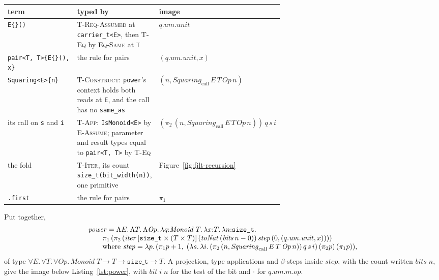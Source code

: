 \begin{center}
\small
\begin{tabularx}{\linewidth}{@{}>{\raggedright\arraybackslash}p{0.36\linewidth}>{\raggedright\arraybackslash}X>{\raggedright\arraybackslash}p{0.27\linewidth}@{}}
\toprule
term & typed by & image \\
\midrule
\texttt{E\{\}()} & \textsc{T-Req-Assumed} at \texttt{carrier\_t<E>}, then \textsc{T-Eq} by \textsc{Eq-Same} at \texttt{T} & $q.\mathit{um}.\mathit{unit}$ \\
\texttt{pair<T, T>\{E\{\}(), x\}} & the rule for pairs & $(q.\mathit{um}.\mathit{unit}, x)$ \\
\texttt{Squaring<E>\{n\}} & \textsc{T-Construct}: \texttt{power}'s context holds both reads at \texttt{E}, and the call has no \texttt{same\_as} & $(n, \mathit{Squaring}_{\mathrm{call}}\,E\,T\,\mathit{Op}\,n)$ \\
its call on \texttt{s} and \texttt{i} & \textsc{T-App}: \texttt{IsMonoid<E>} by \textsc{E-Assume}; parameter and result types equal to \texttt{pair<T, T>} by \textsc{T-Eq} & $(\pi_2\,(n, \mathit{Squaring}_{\mathrm{call}}\,E\,T\,\mathit{Op}\,n))\,q\,s\,i$ \\
the fold & \textsc{T-Iter}, its count \texttt{size\_t(bit\_width(n))}, one primitive & Figure~\ref{fig:fjlt-recursion} \\
\texttt{.first} & the rule for pairs & $\pi_1$ \\
\bottomrule
\end{tabularx}
\end{center}
Put together,
\[
\begin{array}{@{}l@{}}
\mathit{power} = \Lambda E.\,\Lambda T.\,\Lambda \mathit{Op}.\,\lambda q{:}\mathit{Monoid}\;T.\,\lambda x{:}T.\,\lambda n{:}\texttt{size\_t}. \\
\qquad \pi_1\,(\pi_2\,(\mathit{iter}\,[\texttt{size\_t} \times (T \times T)]\,(\mathit{toNat}\,(\mathit{bits}\,n - 0))\,\mathit{step}\,(0, (q.\mathit{um}.\mathit{unit}, x)))) \\
\qquad \text{where } \mathit{step} = \lambda p.\,(\pi_1 p + 1,\; (\lambda s.\,\lambda i.\,(\pi_2\,(n, \mathit{Squaring}_{\mathrm{call}}\,E\,T\,\mathit{Op}\,n))\,q\,s\,i)\,(\pi_2 p)\,(\pi_1 p)),
\end{array}
\]
of type $\forall E.\,\forall T.\,\forall \mathit{Op}.\,\mathit{Monoid}\;T \to T \to \texttt{size\_t} \to T$.
A projection, type applications and $\beta$-steps inside $\mathit{step}$, with the count written $\mathit{bits}\;n$, give the image below Listing~\ref{lst:power}, with $\mathit{bit}\;i\;n$ for the test of the bit and $\cdot$ for $q.\mathit{um}.\mathit{m}.\mathit{op}$.

